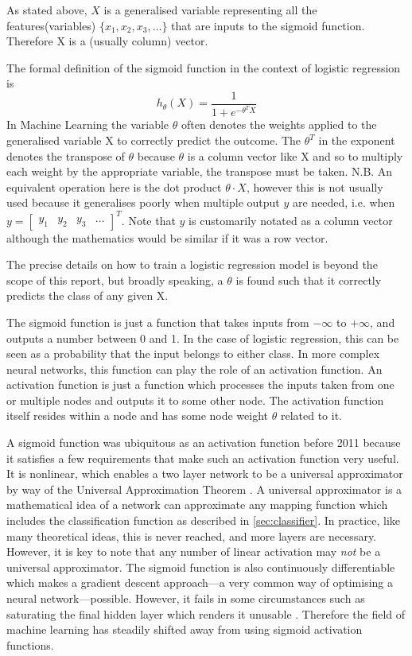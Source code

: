 \documentclass[a4paper,fleqn,usenatbib]{mnras}
\begin{document}
As stated above, $X$ is a generalised variable representing all the features(variables) $\{x_1,x_2,x_3,...\}$ that are inputs to the sigmoid function. Therefore X is a (usually column) vector.

The formal definition of the sigmoid function in the context of logistic regression is 
\begin{equation}
	h_\theta(X)=\frac{1}{1+e^{-\theta^T X}}
\end{equation}
In Machine Learning the variable $\theta$ often denotes the weights applied to the generalised variable X to correctly predict the outcome. The $\theta^T$ in the exponent denotes the transpose of $\theta$ because $\theta$ is a column vector like X and so to multiply each weight by the appropriate variable, the transpose must be taken. N.B. An equivalent operation here is the dot product $\theta \cdot X$, however this is not usually used because it generalises poorly when multiple output $y$ are needed, i.e. when $y=\begin{bmatrix} y_{1} & y_{2} & y_{3} &\hdots \end{bmatrix}^T$. Note that $y$ is customarily notated as a column vector although the mathematics would be similar if it was a row vector.

The precise details on how to train a logistic regression model is beyond the scope of this report, but broadly speaking, a $\theta$ is found such that it correctly predicts the class of any given X. 

The sigmoid function is just a function that takes inputs from $-\infty$ to $+\infty$, and outputs a number between 0 and 1. In the case of logistic regression, this can be seen as a probability that the input belongs to either class. In more complex neural networks, this function can play the role of an activation function. An activation function is just a function which processes the inputs taken from one or multiple nodes and outputs it to some other node. The activation function itself resides within a node and has some node weight $\theta$ related to it. 

A sigmoid function was ubiquitous as an activation function before 2011 because it satisfies a few requirements that make such an activation function very useful. It is nonlinear, which enables a two layer network to be a universal approximator by way of the Universal Approximation Theorem \citep{UniversalApproximationTheorem}. A universal approximator is a mathematical idea of a network can approximate any mapping function which includes the classification function as described in \ref{sec:classifier}. In practice, like many theoretical ideas, this is never reached, and more layers are necessary. However, it is key to note that any number of  linear activation may \textit{not} be a universal approximator. The sigmoid function is also continuously differentiable which makes a gradient descent approach---a very common way of optimising a neural network---possible. However, it fails in some circumstances such as saturating the final hidden layer which renders it unusable \citep{ReLu}. Therefore the field of machine learning has steadily shifted away from using sigmoid activation functions.
\end{document}

